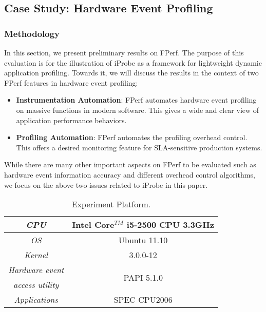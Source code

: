 \subsection{Case Study: Hardware Event Profiling}
\label{sec:eva}

\subsubsection{Methodology}

In this section, we present preliminary results on FPerf.
The purpose of this evaluation is for the illustration of iProbe
as a framework for lightweight dynamic application profiling. 
Towards it, we will discuss the results in the context of two FPerf features in hardware event profiling: 
\begin{itemize}
\item \textbf{Instrumentation Automation}: \quad FPerf automates hardware event profiling on massive functions in modern software. This gives a wide and clear view of application performance behaviors.
\item \textbf{Profiling Automation}: \quad FPerf automates the profiling overhead control. This offers a desired monitoring feature for SLA-sensitive production systems. %
\end{itemize}
While there are many other important aspects on FPerf to be evaluated such as hardware event information accuracy and different overhead control algorithms, 
we focus on the above two issues related to iProbe in this paper. 

\begin{table}[h!]
\caption{Experiment Platform.}
\label{tab:serverparameter}
\centering
\begin{tabular}{|c|c|}
\hline
\emph{CPU} & Intel Core$^{TM}$ i5-2500 CPU 3.3GHz\\\hline
\emph{OS} & Ubuntu 11.10 \\ \hline
\emph{Kernel} & 3.0.0-12 \\ \hline
\emph{Hardware event} &  \multirow{2}{*}{PAPI 5.1.0} \\ 
\emph{access utility} &  \\ \hline
\emph{Applications} & SPEC CPU2006 \\ \hline
\end{tabular}
\end{table}

